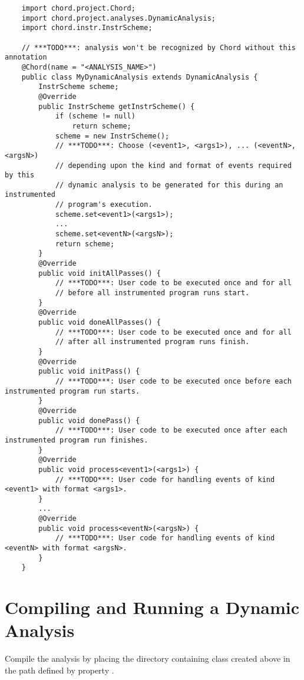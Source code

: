 \begin{framed}
{\small
\begin{verbatim}
    import chord.project.Chord;
    import chord.project.analyses.DynamicAnalysis;
    import chord.instr.InstrScheme;

    // ***TODO***: analysis won't be recognized by Chord without this annotation
    @Chord(name = "<ANALYSIS_NAME>")    
    public class MyDynamicAnalysis extends DynamicAnalysis {
        InstrScheme scheme;
        @Override
        public InstrScheme getInstrScheme() {
            if (scheme != null)
                return scheme;
            scheme = new InstrScheme();
            // ***TODO***: Choose (<event1>, <args1>), ... (<eventN>, <argsN>)
            // depending upon the kind and format of events required by this
            // dynamic analysis to be generated for this during an instrumented
            // program's execution.
            scheme.set<event1>(<args1>);
            ...
            scheme.set<eventN>(<argsN>);
            return scheme;
        }
        @Override
        public void initAllPasses() {
            // ***TODO***: User code to be executed once and for all
            // before all instrumented program runs start.
        }
        @Override
        public void doneAllPasses() {
            // ***TODO***: User code to be executed once and for all
            // after all instrumented program runs finish.
        }
        @Override
        public void initPass() {
            // ***TODO***: User code to be executed once before each instrumented program run starts.
        }
        @Override
        public void donePass() {
            // ***TODO***: User code to be executed once after each instrumented program run finishes.
        }
        @Override
        public void process<event1>(<args1>) {
            // ***TODO***: User code for handling events of kind <event1> with format <args1>.
        }
        ...
        @Override
        public void process<eventN>(<argsN>) {
            // ***TODO***: User code for handling events of kind <eventN> with format <argsN>.
        }
    }
\end{verbatim}
}
\end{framed}

\section{Compiling and Running a Dynamic Analysis}
\label{sec:running-dynamic}

Compile the analysis by placing the directory containing class  created
above in the path defined by property .

